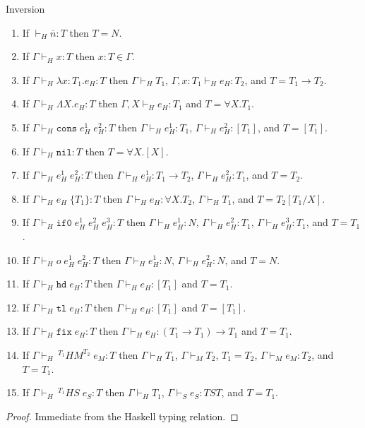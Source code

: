 \begin{hi}
\label{hi}
Inversion
\begin{enumerate}
\item If $\vdash_{H}\overline{n}:T$ then $T=N$.
\item If $\Gamma\vdash_{H}x:T$ then $x:T\in\Gamma$.
\item If $\Gamma\vdash_{H}\lambda x:T_{1}.e_{H}:T$ then $\Gamma\vdash_{H}T_{1}$, $\Gamma,x:T_{1}\vdash_{H}e_{H}:T_{2}$, and $T=T_{1}\rightarrow T_{2}$.
\item If $\Gamma\vdash_{H}\Lambda X.e_{H}:T$ then $\Gamma,X\vdash_{H}e_{H}:T_{1}$ and $T=\forall X.T_{1}$.
\item If $\Gamma\vdash_{H}\mathtt{cons}\;e_{H}^{1}\;e_{H}^{2}:T$ then $\Gamma\vdash_{H}e_{H}^{1}:T_{1}$, $\Gamma\vdash_{H}e_{H}^{2}:[T_{1}]$, and $T=[T_{1}]$.
\item If $\Gamma\vdash_{H}\mathtt{nil}:T$ then $T=\forall X.[X]$.
\item If $\Gamma\vdash_{H}e_{H}^{1}\;e_{H}^{2}:T$ then $\Gamma\vdash_{H}e_{H}^{1}:T_{1}\rightarrow T_{2}$, $\Gamma\vdash_{H}e_{H}^{2}:T_{1}$, and $T=T_{2}$.
\item If $\Gamma\vdash_{H}e_{H}\;\lbrace T_{1}\rbrace:T$ then $\Gamma\vdash_{H}e_{H}:\forall X.T_{2}$, $\Gamma\vdash_{H}T_{1}$, and $T=T_{2}[T_{1}/X]$.
\item If $\Gamma\vdash_{H}\mathtt{if0}\;e_{H}^{1}\;e_{H}^{2}\;e_{H}^{3}:T$ then $\Gamma\vdash_{H}e_{H}^{1}:N$, $\Gamma\vdash_{H}e_{H}^{2}:T_{1}$, $\Gamma\vdash_{H}e_{H}^{3}:T_{1}$, and $T=T_{1}$.
\item If $\Gamma\vdash_{H}o\;e_{H}^{1}\;e_{H}^{2}:T$ then $\Gamma\vdash_{H}e_{H}^{1}:N$, $\Gamma\vdash_{H}e_{H}^{2}:N$, and $T=N$.
\item If $\Gamma\vdash_{H}\mathtt{hd}\;e_{H}:T$ then $\Gamma\vdash_{H}e_{H}:[T_{1}]$ and $T=T_{1}$.
\item If $\Gamma\vdash_{H}\mathtt{tl}\;e_{H}:T$ then $\Gamma\vdash_{H}e_{H}:[T_{1}]$ and $T=[T_{1}]$.
\item If $\Gamma\vdash_{H}\mathtt{fix}\;e_{H}:T$ then $\Gamma\vdash_{H}e_{H}:(T_{1}\rightarrow T_{1})\rightarrow T_{1}$ and $T=T_{1}$.
\item If $\Gamma\vdash_{H}\,^{T_{1}}HM^{T_{2}}\;e_{M}:T$ then $\Gamma\vdash_{H}T_{1}$, $\Gamma\vdash_{M}T_{2}$, $T_{1}=T_{2}$, $\Gamma\vdash_{M}e_{M}:T_{2}$, and $T=T_{1}$.
\item If $\Gamma\vdash_{H}\,^{T_{1}}HS\;e_{S}:T$ then $\Gamma\vdash_{H}T_{1}$, $\Gamma\vdash_{S}e_{S}:TST$, and $T=T_{1}$.
\end{enumerate}
\begin{proof}
Immediate from the Haskell typing relation.
\end{proof}
\end{hi}